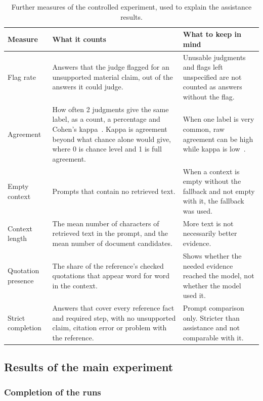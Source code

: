\begin{table}[htbp]
\centering\small
\caption[Further measures of the controlled experiment]{Further measures of the controlled experiment, used to explain the assistance results.}
\label{tab:metrics}
\begin{tabularx}{\linewidth}{>{\raggedright\arraybackslash}p{2.7cm}>{\raggedright\arraybackslash}X>{\raggedright\arraybackslash}X}
\toprule
Measure & What it counts & What to keep in mind \\
\midrule
Flag rate & Answers that the judge flagged for an unsupported material claim, out of the answers it could judge. & Unusable judgments and flags left unspecified are not counted as answers without the flag. \\
Agreement & How often 2 judgments give the same label, as a count, a percentage and Cohen's kappa~\cite{cohen1960kappa}. Kappa is agreement beyond what chance alone would give, where 0 is chance level and 1 is full agreement. & When one label is very common, raw agreement can be high while kappa is low~\cite{feinstein1990kappa}. \\
Empty context & Prompts that contain no retrieved text. & When a context is empty without the fallback and not empty with it, the fallback was used. \\
Context length & The mean number of characters of retrieved text in the prompt, and the mean number of document candidates. & More text is not necessarily better evidence. \\
Quotation presence & The share of the reference's checked quotations that appear word for word in the context. & Shows whether the needed evidence reached the model, not whether the model used it. \\
Strict completion & Answers that cover every reference fact and required step, with no unsupported claim, citation error or problem with the reference. & Prompt comparison only. Stricter than assistance and not comparable with it. \\
\bottomrule
\end{tabularx}
\end{table}

\subsection{Results of the main experiment}

\subsubsection{Completion of the runs}

